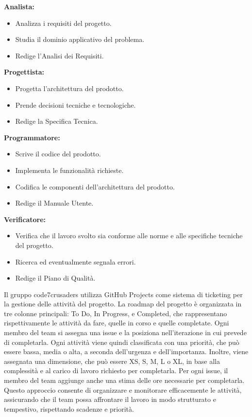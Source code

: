 \textbf{Analista:}
\begin{itemize}
    \item Analizza i requisiti del progetto.
    \item Studia il dominio applicativo del problema.
    \item Redige l’Analisi dei Requisiti.
\end{itemize}

\textbf{Progettista:}
\begin{itemize}
    \item Progetta l’architettura del prodotto.
    \item Prende decisioni tecniche e tecnologiche.
    \item Redige la Specifica Tecnica.
\end{itemize}

\textbf{Programmatore:}
\begin{itemize}
    \item Scrive il codice del prodotto.
    \item Implementa le funzionalità richieste.
    \item Codifica le componenti dell’architettura del prodotto.
    \item Redige il Manuale Utente.
\end{itemize}

\textbf{Verificatore:}
\begin{itemize}
    \item Verifica che il lavoro svolto sia conforme alle norme e alle specifiche tecniche del progetto.
    \item Ricerca ed eventualmente segnala errori.
    \item Redige il Piano di Qualità.
\end{itemize}


Il gruppo code7crusaders utilizza GitHub Projects come sistema di ticketing per la gestione delle attività del progetto. La roadmap del progetto è organizzata in tre colonne principali: To Do, In Progress, e Completed, che rappresentano rispettivamente le attività da fare, quelle in corso e quelle completate. Ogni membro del team si assegna una issue e la posiziona nell'iterazione in cui prevede di completarla. Ogni attività viene quindi classificata con una priorità, che può essere bassa, media o alta, a seconda dell'urgenza e dell'importanza. Inoltre, viene assegnata una dimensione, che può essere XS, S, M, L o XL, in base alla complessità e al carico di lavoro richiesto per completarla. Per ogni issue, il membro del team aggiunge anche una stima delle ore necessarie per completarla. Questo approccio consente di organizzare e monitorare efficacemente le attività, assicurando che il team possa affrontare il lavoro in modo strutturato e tempestivo, rispettando scadenze e priorità.


